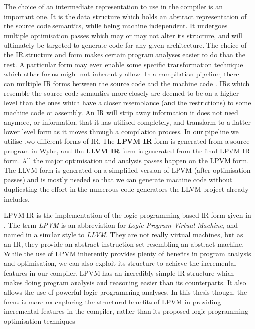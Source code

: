 The choice of an intermediate representation to use in the compiler is an
important one. It is the data structure which holds an abstract representation
of the source code semantics, while being machine independent. It undergoes
multiple optimisation passes which may or may not alter its structure, and will
ultimately be targeted to generate code for any given architecture. The choice
of the IR structure and form makes certain program analyses easier to do than
the rest. A particular form may even enable some specific transformation
technique which other forms might not inherently allow. In a compilation
pipeline, there can multiple IR forms between the source code and the machine
code \citep{irnote}. IRs which resemble the source code semantics more closely
are deemed to be on a higher level than the ones which have a closer
resemblance (and the restrictions) to some machine code or assembly. An IR will
strip away information it does not need anymore, or information that it has
utilised completely, and transform to a flatter lower level form as it moves
through a compilation process. In our pipeline we utilise two different forms
of IR. The \textbf{LPVM IR} form is generated from a source program in Wybe,
and the \textbf{LLVM IR} form is generated from the final LPVM IR form. All the
major optimisation and analysis passes happen on the LPVM form. The LLVM form
is generated on a simplified version of LPVM (after optimisation passes) and is
mostly needed so that we can generate machine code without duplicating the
effort in the numerous code generators the LLVM project already includes.

LPVM IR is the implementation of the logic programming based IR form given in
\cite{lpvm2015}. The term \textit{LPVM} is an abbreviation for \textit{Logic
  Program Virtual Machine}, and named in a similar style to \textit{LLVM}. They
are not really virtual machines, but as an IR, they provide an abstract
instruction set resembling an abstract machine. While the use of LPVM
inherently provides plenty of benefits in program analysis and optimisation, we
can also exploit its structure to achieve the incremental features in our
compiler. LPVM has an incredibly simple IR structure which makes doing program
analysis and reasoning easier than its counterparts. It also allows the use of
powerful logic programming analyses. In this thesis though, the focus is more
on exploring the structural benefits of LPVM in providing incremental features
in the compiler, rather than its proposed logic programming optimisation
techniques.

